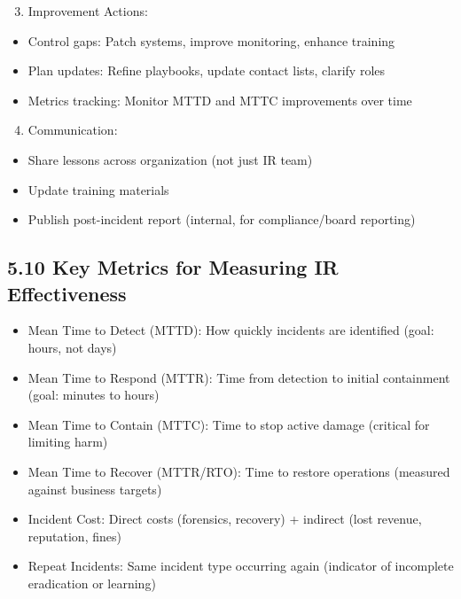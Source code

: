 \documentclass[10pt]{article}
\begin{document}
\begin{enumerate}
  \setcounter{enumi}{2}
  \item Improvement Actions:
\end{enumerate}

\begin{itemize}
  \item Control gaps: Patch systems, improve monitoring, enhance training
  \item Plan updates: Refine playbooks, update contact lists, clarify roles
  \item Metrics tracking: Monitor MTTD and MTTC improvements over time
\end{itemize}

\begin{enumerate}
  \setcounter{enumi}{3}
  \item Communication:
\end{enumerate}

\begin{itemize}
  \item Share lessons across organization (not just IR team)
  \item Update training materials
  \item Publish post-incident report (internal, for compliance/board reporting)
\end{itemize}

\subsection*{5.10 Key Metrics for Measuring IR Effectiveness}
\begin{itemize}
  \item Mean Time to Detect (MTTD): How quickly incidents are identified (goal: hours, not days)
  \item Mean Time to Respond (MTTR): Time from detection to initial containment (goal: minutes to hours)
  \item Mean Time to Contain (MTTC): Time to stop active damage (critical for limiting harm)
  \item Mean Time to Recover (MTTR/RTO): Time to restore operations (measured against business targets)
  \item Incident Cost: Direct costs (forensics, recovery) + indirect (lost revenue, reputation, fines)
  \item Repeat Incidents: Same incident type occurring again (indicator of incomplete eradication or learning)
\end{itemize}
\end{document}
